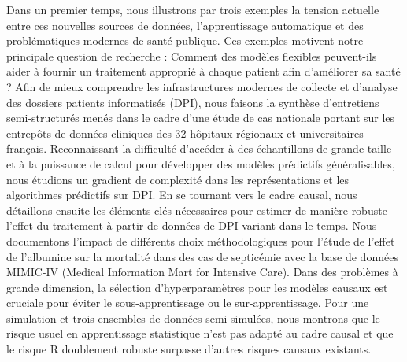 \documentclass[french,12pt,twoside,a4paper]{book}
\begin{document}
\begin{mdframed}[linecolor=Prune,linewidth=1]
\begin{multicols}{2}
    Dans un premier temps, nous illustrons par trois exemples la tension
    actuelle entre ces nouvelles sources de données, l'apprentissage automatique
    et des problématiques modernes de santé publique. Ces exemples motivent
    notre principale question de recherche : Comment des modèles flexibles
    peuvent-ils aider à fournir un traitement approprié à chaque patient afin
    d'améliorer sa santé ?
    Afin de mieux comprendre les infrastructures modernes de collecte
    et d'analyse des dossiers patients informatisés (DPI), nous faisons la
    synthèse d'entretiens semi-structurés menés dans le cadre d'une étude de cas
    nationale portant sur les entrepôts de données cliniques des 32 hôpitaux
    régionaux et universitaires français.
    Reconnaissant la difficulté d'accéder à des échantillons de grande taille et à
    la puissance de calcul pour développer des modèles prédictifs généralisables,
    nous étudions un gradient de complexité dans les représentations et les
    algorithmes prédictifs sur DPI.
    En se tournant vers le cadre causal, nous détaillons ensuite les éléments clés
    nécessaires pour estimer de manière robuste l'effet du traitement à partir de
    données de DPI variant dans le temps. Nous documentons l'impact de différents
    choix méthodologiques pour l'étude de l'effet de
    l'albumine sur la mortalité dans des cas de septicémie avec la base de données
    MIMIC-IV (Medical Information Mart for Intensive Care).
    Dans des problèmes à grande dimension, la sélection d'hyperparamètres pour
    les modèles causaux est cruciale pour éviter le sous-apprentissage ou le
    sur-apprentissage. Pour une simulation et trois ensembles de données
    semi-simulées, nous montrons que le risque usuel en apprentissage
    statistique n'est pas adapté au cadre causal et que le risque R doublement
    robuste surpasse d'autres risques causaux existants.
  \end{multicols}

\end{mdframed}
\end{document}
